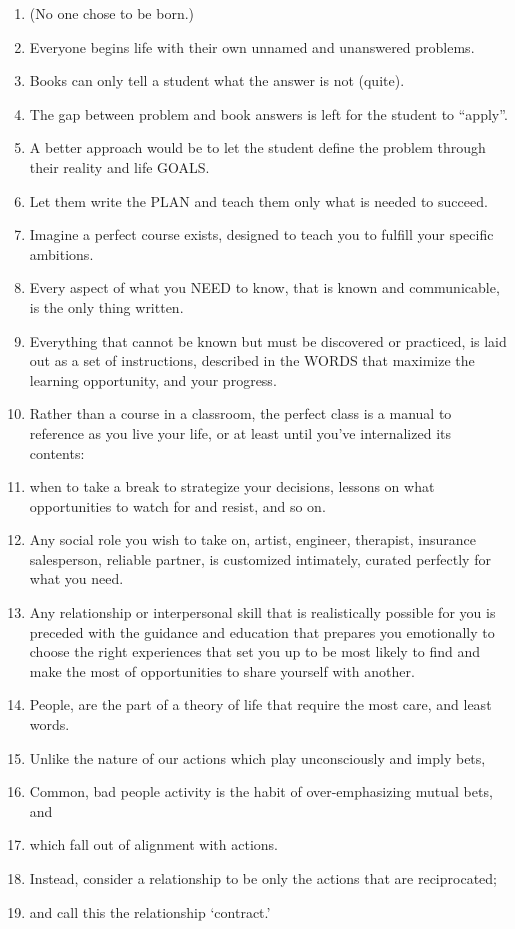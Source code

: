 \documentclass[
]{book}
\begin{document}
\begin{enumerate}
\def\labelenumi{\arabic{enumi}.}
\setcounter{enumi}{32}
\item
  (No one chose to be born.)
\item
  Everyone begins life with their own unnamed and unanswered
  problems.
\item
  Books can only tell a student what the answer is not (quite).
\item
  The gap between problem and book answers is left for the student to
  ``apply''.
\item
  A better approach would be to let the student define the problem
  through their reality and life GOALS.
\item
  Let them write the PLAN and teach them only what is needed to
  succeed.
\item
  Imagine a perfect course exists, designed to teach you to fulfill your
  specific ambitions.
\item
  Every aspect of what you NEED to know, that is known and
  communicable, is the only thing written.
\item
  Everything that cannot be known but must be discovered or practiced,
  is laid out as a set of instructions, described in the WORDS that
  maximize the learning opportunity, and your progress.
\item
  Rather than a course in a classroom, the perfect class is a manual to
  reference as you live your life, or at least until you've internalized its
  contents:
\item
  when to take a break to strategize your decisions, lessons on what
  opportunities to watch for and resist, and so on.
\item
  Any social role you wish to take on, artist, engineer, therapist,
  insurance salesperson, reliable partner, is customized intimately,
  curated perfectly for what you need.
\item
  Any relationship or interpersonal skill that is realistically possible for
  you is preceded with the guidance and education that prepares you
  emotionally to choose the right experiences that set you up to be
  most likely to find and make the most of opportunities to share
  yourself with another.
\item
  People, are the part of a theory of life that require the most care, and least words.
\item
  Unlike the nature of our actions which play unconsciously and imply bets,
\item
  Common, bad people activity is the habit of over-emphasizing mutual bets, and
\item
  which fall out of alignment with actions.
\item
  Instead, consider a relationship to be only the actions that are reciprocated;
\item
  and call this the relationship `contract.'
\end{enumerate}
\end{document}
